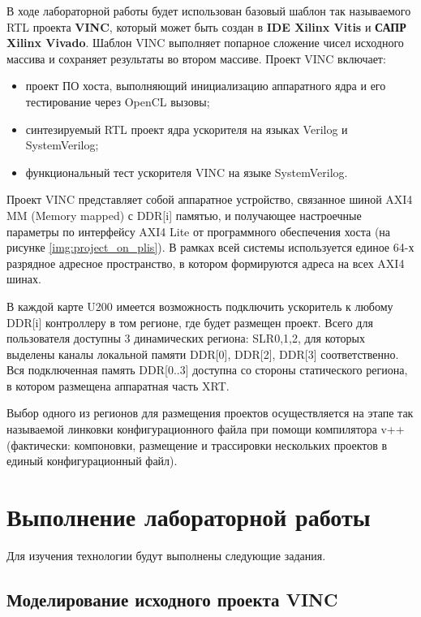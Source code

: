 В ходе лабораторной работы будет использован базовый шаблон так называемого RTL проекта \textbf{VINC}, который может быть создан в \textbf{IDE Xilinx Vitis} и \textbf{САПР Xilinx Vivado}. Шаблон VINC выполняет попарное сложение чисел исходного массива и сохраняет результаты во втором массиве. Проект VINC включает:

\begin{itemize}
	\item проект ПО хоста, выполняющий инициализацию аппаратного ядра и его тестирование через OpenCL вызовы;
	\item синтезируемый RTL проект ядра ускорителя на языках Verilog и SystemVerilog;
	\item функциональный тест ускорителя VINC на языке SystemVerilog.
\end{itemize}

Проект VINC представляет собой аппаратное устройство, связанное шиной AXI4 MM (Memory mapped) с DDR[i] памятью, и получающее настроечные параметры по интерфейсу AXI4 Lite от программного обеспечения хоста (на рисунке \ref{img:project_on_plis}). В рамках всей системы используется единое 64-х разрядное адресное пространство, в котором формируются адреса на всех AXI4 шинах.



В каждой карте U200 имеется возможность подключить ускоритель к любому DDR[i] контроллеру в том регионе, где будет размещен проект. Всего для пользователя доступны 3 динамических региона: SLR0,1,2, для которых выделены каналы локальной памяти DDR[0], DDR[2], DDR[3] соответственно. Вся подключенная память DDR[0..3] доступна со стороны статического региона, в котором размещена аппаратная часть XRT.

Выбор одного из регионов для размещения проектов осуществляется на этапе так называемой линковки конфигурационного файла при помощи компилятора v++(фактически: компоновки, размещение и трассировки нескольких проектов в единый конфигурационный файл).


\chapter{Выполнение лабораторной работы}

Для изучения технологии будут выполнены следующие задания.

\section{Моделирование исходного проекта VINC}

